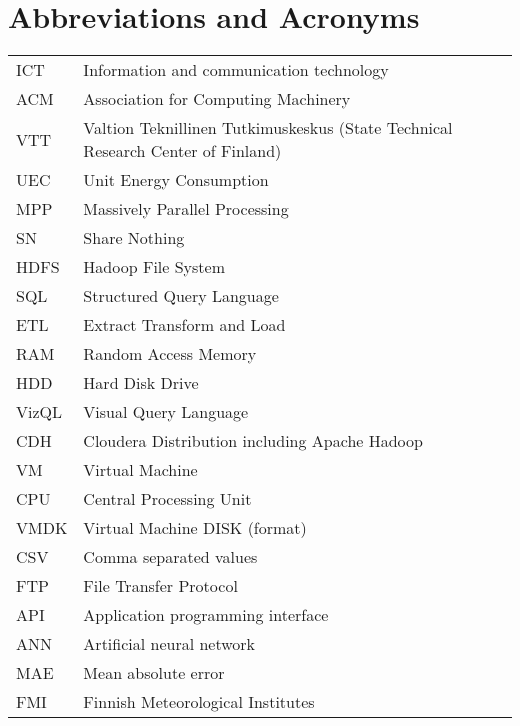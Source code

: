 \chapter*{Abbreviations and Acronyms}


\noindent
\begin{longtable}{@{}p{}p{}@{}}
ICT & Information and communication technology \\
ACM & Association for Computing Machinery \\
VTT & Valtion Teknillinen Tutkimuskeskus (State Technical Research Center of Finland) \\ 
UEC & Unit Energy Consumption \\ 
MPP  & Massively Parallel Processing \\
SN & Share Nothing \\ 
HDFS & Hadoop File System\\
SQL & Structured Query Language\\
ETL & Extract Transform and Load\\
RAM & Random Access Memory\\
HDD & Hard Disk Drive\\
VizQL & Visual Query Language\\
CDH & Cloudera Distribution including Apache Hadoop\\
VM & Virtual Machine\\
CPU & Central Processing Unit\\
VMDK & Virtual Machine DISK (format)\\
CSV & Comma separated values\\
FTP & File Transfer Protocol\\
API & Application programming interface\\
ANN & Artificial neural network\\
MAE & Mean absolute error\\
FMI & Finnish Meteorological Institutes\\
\end{longtable}
